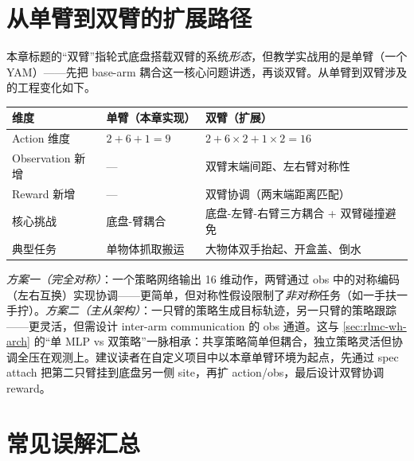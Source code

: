 \section{从单臂到双臂的扩展路径}
\label{sec:rlmc-wh-bimanual}

本章标题的“双臂”指轮式底盘搭载双臂的系统\emph{形态}，但教学实战用的是单臂（一个 YAM）——先把 base-arm 耦合这一核心问题讲透，再谈双臂。从单臂到双臂涉及的工程变化如下。

\begin{center}
\small
\begin{tabular}{@{}lll@{}}
\toprule
维度 & 单臂（本章实现） & 双臂（扩展） \\
\midrule
Action 维度 & $2+6+1=9$ & $2+6\times2+1\times2=16$ \\
Observation 新增 & --- & 双臂末端间距、左右臂对称性 \\
Reward 新增 & --- & 双臂协调（两末端距离匹配） \\
核心挑战 & 底盘-臂耦合 & 底盘-左臂-右臂三方耦合 + 双臂碰撞避免 \\
典型任务 & 单物体抓取搬运 & 大物体双手抬起、开盒盖、倒水 \\
\bottomrule
\end{tabular}
\end{center}

\begin{insight}\label{ins:rlmc-wh-shared}
\emph{方案一（完全对称）}：一个策略网络输出 16 维动作，两臂通过 obs 中的对称编码（左右互换）实现协调——更简单，但对称性假设限制了\emph{非对称}任务（如一手扶一手拧）。\emph{方案二（主从架构）}：一只臂的策略生成目标轨迹，另一只臂的策略跟踪——更灵活，但需设计 inter-arm communication 的 obs 通道。这与 \cref{sec:rlmc-wh-arch} 的“单 MLP vs 双策略”一脉相承：共享策略简单但耦合，独立策略灵活但协调全压在观测上。建议读者在自定义项目中以本章单臂环境为起点，先通过 spec attach 把第二只臂挂到底盘另一侧 site，再扩 action/obs，最后设计双臂协调 reward。
\end{insight}

\section{常见误解汇总}
\label{sec:rlmc-wh-misconceptions}


